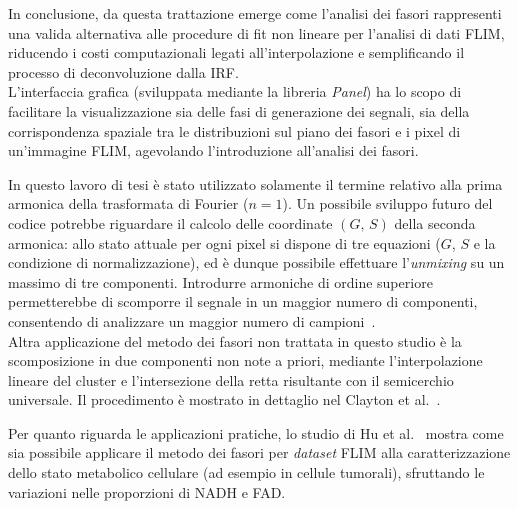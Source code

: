 In conclusione, da questa trattazione emerge come l'analisi dei fasori rappresenti una valida alternativa alle procedure di fit non lineare per l'analisi di dati FLIM, riducendo i costi computazionali legati all'interpolazione e semplificando il processo di deconvoluzione dalla IRF.\\
L'interfaccia grafica (sviluppata mediante la libreria \textit{Panel}) ha lo scopo di facilitare la visualizzazione sia delle fasi di generazione dei segnali, sia della corrispondenza spaziale tra le distribuzioni sul piano dei fasori e i pixel di un'immagine FLIM, agevolando l'introduzione all'analisi dei fasori.

In questo lavoro di tesi è stato utilizzato solamente il termine relativo alla prima armonica della trasformata di Fourier ($n=1$). Un possibile sviluppo futuro del codice potrebbe riguardare il calcolo delle coordinate $(G,\,S)$ della seconda armonica: allo stato attuale per ogni pixel si dispone di tre equazioni ($G$, $S$ e la condizione di normalizzazione), ed è dunque possibile effettuare l'\textit{unmixing} su un massimo di tre componenti. Introdurre armoniche di ordine superiore permetterebbe di scomporre il segnale in un maggior numero di componenti, consentendo di analizzare un maggior numero di campioni~\cite{torradoLinearCombinationProperties2022}.\\
Altra applicazione del metodo dei fasori non trattata in questo studio è la scomposizione in due componenti non note a priori, mediante l'interpolazione lineare del cluster e l'intersezione della retta risultante con il semicerchio universale. Il procedimento è mostrato in dettaglio nel Clayton et al.~\cite{claytonGraphicalRepresentationMulticomponent2004}.

Per quanto riguarda le applicazioni pratiche, lo studio di Hu et al.~\cite{huComparisonPhasorAnalysis2023} mostra come sia possibile applicare il metodo dei fasori per \textit{dataset} FLIM alla caratterizzazione dello stato metabolico cellulare (ad esempio in cellule tumorali), sfruttando le variazioni nelle proporzioni di NADH e FAD.